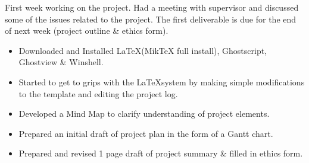 First week working on the project. Had a meeting with supervisor and discussed some of the issues related to the project. The first deliverable is due for the end of next week (project outline \& ethics form). 

\begin{itemize}
  \item Downloaded and Installed \LaTeX \space (MikTeX full install), Ghostscript, Ghostview \& Winshell. 
  \item Started to get to grips with the \LaTeX \space system by making simple modifications to the template and editing the project log.
  \item Developed a Mind Map to clarify understanding of project elements.
  \item Prepared an initial draft of project plan in the form of a Gantt chart. 
  \item Prepared and revised 1 page draft of project summary \& filled in ethics form. 
\end{itemize}



